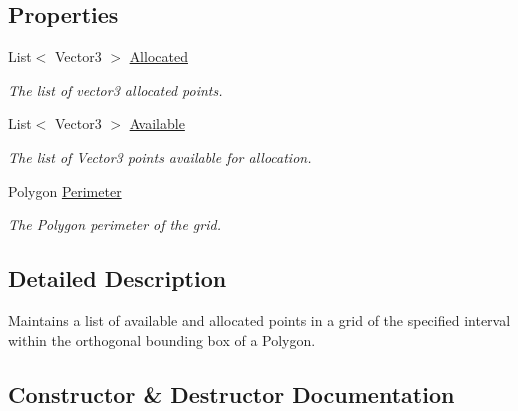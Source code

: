 \subsection*{Properties}
\begin{DoxyCompactItemize}
\item 
List$<$ Vector3 $>$ \mbox{\hyperlink{class_room_kit_1_1_coord_grid_a4b516a308b2c0c8cea57e9b1bc8484b0}{Allocated}}
\begin{DoxyCompactList}\small\item\em The list of vector3 allocated points. \end{DoxyCompactList}\item 
List$<$ Vector3 $>$ \mbox{\hyperlink{class_room_kit_1_1_coord_grid_ad8a24424728e02b5a8693a1be8b2155e}{Available}}
\begin{DoxyCompactList}\small\item\em The list of Vector3 points available for allocation. \end{DoxyCompactList}\item 
Polygon \mbox{\hyperlink{class_room_kit_1_1_coord_grid_a3699e8b4c72626d50c589b900c796260}{Perimeter}}
\begin{DoxyCompactList}\small\item\em The Polygon perimeter of the grid. \end{DoxyCompactList}\end{DoxyCompactItemize}


\subsection{Detailed Description}
Maintains a list of available and allocated points in a grid of the specified interval within the orthogonal bounding box of a Polygon. 



\subsection{Constructor \& Destructor Documentation}
\mbox{\label{class_room_kit_1_1_coord_grid_a7c731b88924003f92e033c77f25b4036}} 
